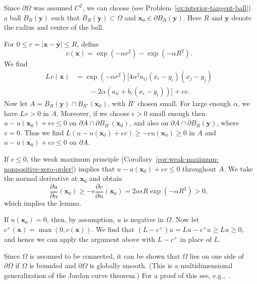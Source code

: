 \begin{Proof}
Since $\partial\Omega$ was assumed $C^2$, we can choose (see Problem~\ref{ex:interior-tangent-ball}) a ball $B_R(\bm{y})$ such that $B_R(\bm{y})\subset\Omega$ and $\bm{x}_0\in\partial B_R(\bm{y})$. Here $R$ and $\bm{y}$ denote the radius and center of the ball.

For $0\leq r=|\bm{x}-\bm{y}|\leq R$, define
\begin{equation}\label{eq:boundary-point-exponential-barrier}
v(\bm{x})=\exp(-\alpha r^2)-\exp(-\alpha R^2).
\end{equation}
We find
\begin{equation}\label{eq:boundary-point-barrier-operator}
\begin{aligned}
Lv(\bm{x})&=\exp(-\alpha r^2)\bigl[4\alpha^2a_{ij}(x_i-y_i)(x_j-y_j)\\
&\qquad-2\alpha(a_{ii}+b_i(x_i-y_i))\bigr]+cv.
\end{aligned}
\end{equation}
Now let $A=B_R(\bm{y})\cap B_{R'}(\bm{x}_0)$, with $R'$ chosen small. For large enough $\alpha$, we have $Lv>0$ in $A$. Moreover, if we choose $\epsilon>0$ small enough then $u-u(\bm{x}_0)+\epsilon v\leq0$ on $\partial A\cap\partial B_{R'}(\bm{x}_0)$, and also on $\partial A\cap\partial B_R(\bm{y})$, where $v=0$. Thus we find $L(u-u(\bm{x}_0)+\epsilon v)\geq-cu(\bm{x}_0)\geq0$ in $A$ and $u-u(\bm{x}_0)+\epsilon v\leq0$ on $\partial A$.

If $c\leq0$, the weak maximum principle (Corollary~\ref{cor:weak-maximum-nonpositive-zero-order}) implies that $u-u(\bm{x}_0)+\epsilon v\leq0$ throughout $A$. We take the normal derivative at $\bm{x}_0$ and obtain
\begin{equation}\label{eq:boundary-point-positive-normal-derivative}
\dfrac{\partial u}{\partial n}(\bm{x}_0)\geq-\epsilon\dfrac{\partial v}{\partial n}(\bm{x}_0)=2\alpha\epsilon R\exp(-\alpha R^2)>0,
\end{equation}
which implies the lemma.

If $u(\bm{x}_0)=0$, then, by assumption, $u$ is negative in $\Omega$. Now let $c^+(\bm{x})=\max(0,c(\bm{x}))$. We find that $(L-c^+)u=Lu-c^+u\geq Lu\geq0$, and hence we can apply the argument above with $L-c^+$ in place of $L$.
\end{Proof}

\begin{Remark}
\label{rem:boundary-one-side-jordan}
Since $\Omega$ is assumed to be connected, it can be shown that $\Omega$ lies on one side of $\partial\Omega$ if $\Omega$ is bounded and $\partial\Omega$ is globally smooth. (This is a multidimensional generalization of the Jordan curve theorem.) For a proof of this see, e.g.,~\cite{Mas}.
\end{Remark}

